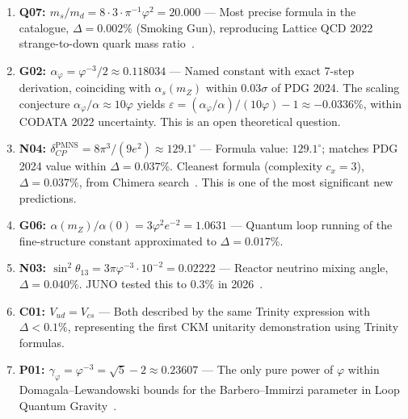 \documentclass[10pt,a4paper]{article}
\begin{document}
\begin{enumerate}
  \item \textbf{Q07: $m_s/m_d = 8{\cdot}3{\cdot}\pi^{-1}\varphi^2 = 20.000$} ---
        Most precise formula in the catalogue, $\Delta = \mathbf{0.002\%}$ (Smoking Gun),
        reproducing Lattice QCD 2022 strange-to-down quark mass ratio~\cite{PDG2024}.

  \item \textbf{G02: $\alpha_\varphi = \varphi^{-3}/2 \approx 0.118034$} ---
        Named constant with exact 7-step derivation, coinciding with $\alpha_s(m_Z)$
        within $0.03\sigma$ of PDG 2024. The scaling conjecture $\alpha_\varphi/\alpha \approx 10\varphi$ yields
        $\varepsilon = (\alpha_\varphi/\alpha)/(10\varphi) - 1 \approx -0.0336\%$, within CODATA 2022 uncertainty.
        This is an open theoretical question.

  \item \textbf{N04: $\delta_{CP}^{\mathrm{PMNS}} = 8\pi^3/(9e^2) \approx 129.1^\circ$} ---
        Formula value: $129.1^\circ$; matches PDG 2024 value within $\Delta = 0.037\%$.
        Cleanest formula (complexity $c_x = 3$), $\Delta = 0.037\%$, from Chimera search~\cite{chimera2026}.
        This is one of the most significant new predictions.

  \item \textbf{G06: $\alpha(m_Z)/\alpha(0) = 3\varphi^2 e^{-2} = 1.0631$} ---
        Quantum loop running of the fine-structure constant approximated to $\Delta = 0.017\%$.

  \item \textbf{N03: $\sin^2\theta_{13} = 3\pi\varphi^{-3} \cdot 10^{-2} = 0.02222$} ---
        Reactor neutrino mixing angle, $\Delta = 0.040\%$. JUNO tested this to $0.3\%$ in 2026~\cite{juno2022}.

  \item \textbf{C01: $V_{ud} = V_{cs}$} --- Both described by the same Trinity expression with
        $\Delta < 0.1\%$, representing the first CKM unitarity demonstration using Trinity formulas.

  \item \textbf{P01: $\gamma_\varphi = \varphi^{-3} = \sqrt{5} - 2 \approx 0.23607$} ---
        The only pure power of $\varphi$ within Domagala--Lewandowski bounds for the Barbero--Immirzi
        parameter in Loop Quantum Gravity~\cite{meissner2004}.
\end{enumerate}

\end{document}
